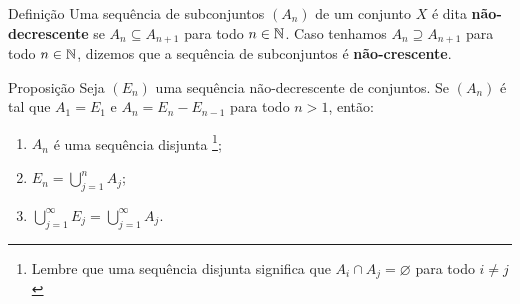 \begin{env}{Definição}
\label{def:sequência-crescente-decrescente-de-conjuntos}
    Uma sequência de subconjuntos $(A_n)$ de um conjunto $X$ é dita \textbf{não-decrescente} se $A_n \subseteq A_{n+1}$ para todo $n \in \operatorname{\mathbb{N}}$.
    Caso tenhamos $A_n \supseteq A_{n+1}$ para todo $n \in \operatorname{\mathbb{N}}$, dizemos que a sequência de subconjuntos é \textbf{não-crescente}.
\end{env}

\begin{env}{Proposição}
\label{prop:sequencia-crescente-conjuntos-resultado-A_n}
Seja $(E_n)$ uma sequência não-decrescente de conjuntos. Se $(A_n)$ é tal que $A_1 = E_1$ e $A_n = E_n - E_{n -1}$ para todo $n > 1$, então:
\begin{enumerate}[label* = (\roman*)]
    \item $A_n$ é uma sequência disjunta
        \footnote{
        	Lembre que uma sequência disjunta significa que $A_i \cap A_j = \varnothing$ para todo $i \neq j$};
    \item $E_n = \displaystyle \bigcup_{j = 1}^n A_j$;
    \item $\displaystyle \bigcup_{j = 1}^\infty E_j = \displaystyle \bigcup_{j = 1}^\infty A_j$.
\end{enumerate}
\end{env}

